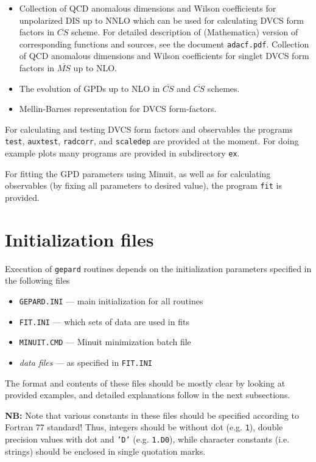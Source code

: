 \documentclass[12pt]{article}
\begin{document}
\begin{itemize}
\item Collection of QCD anomalous dimensions and Wilson coefficients for
unpolarized DIS up to NNLO which can be used for calculating DVCS form factors
in $\overline{CS}$ scheme. For detailed description of (Mathematica) version of
corresponding functions and sources, see the document \texttt{adacf.pdf}.
Collection of QCD anomalous dimensions and Wilson coefficients for singlet DVCS form factors
in $\overline{MS}$ up to NLO.

\item
The evolution of GPDs up to NLO in $\overline{CS}$ and  $\overline{CS}$ schemes.

\item 
Mellin-Barnes representation for DVCS form-factors.
\end{itemize}

For calculating and testing DVCS form factors and observables the programs \texttt{test},
\texttt{auxtest}, \texttt{radcorr}, and \texttt{scaledep} are provided at the
moment. For doing example plots many programs are provided in subdirectory \texttt{ex}.

For fitting the GPD parameters using Minuit, as well as for calculating observables (by
fixing all parameters to desired value), the program \texttt{fit} is provided.

\section{Initialization files}
\label{sec:init}

Execution of \texttt{gepard} routines depends on the initialization parameters specified in
the following files
\begin{itemize}
\item  \texttt{GEPARD.INI} --- main initialization for all routines
\item  \texttt{FIT.INI} --- which sets of data are used in fits
\item \texttt{MINUIT.CMD} --- Minuit minimization batch file
\item \emph{data files} --- as specified in \texttt{FIT.INI}
\end{itemize}
The format and contents of these files should be mostly clear by looking at provided
examples, and detailed explanations follow in the next subsections.

\textbf{NB:} Note that various constants in these files should be specified
according to Fortran 77 standard! Thus, integers should be without dot (e.g.
\texttt{1}), double precision values with dot and \texttt{'D'} (e.g.
\texttt{1.D0}), while character constants (i.e. strings) should be enclosed in
single quotation marks.
\end{document}
